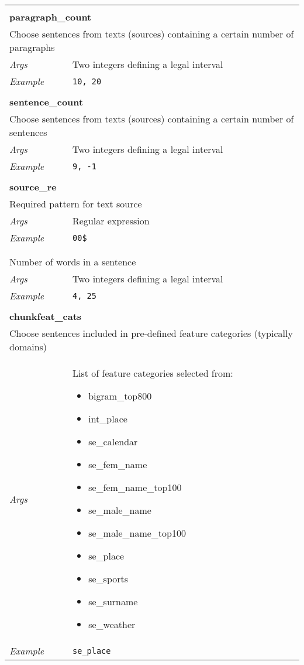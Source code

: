 \begin{longtable}{lp{12cm}}
  & \\
  
  \multicolumn{2}{l}{\bf paragraph\_count}\\
  \multicolumn{2}{l}{Choose sentences from texts (sources) containing a certain number of paragraphs}\\
  \em Args & Two integers defining a legal interval\\
  \em Example & \tt 10, 20\\

  & \\
  
  \multicolumn{2}{l}{\bf sentence\_count}\\
  \multicolumn{2}{l}{Choose sentences from texts (sources) containing a certain number of sentences}\\
  \em Args & Two integers defining a legal interval\\
  \em Example & \tt 9, -1\\

  & \\
  
  \multicolumn{2}{l}{\bf source\_re}\\
  \multicolumn{2}{l}{Required pattern for text source}\\
  \em Args & Regular expression\\
  \em Example & \tt 00\$\\

  & \\\newpage
  
  \multicolumn{2}{l}{\bf word\_count}\\
  \multicolumn{2}{l}{Number of words in a sentence}\\
  \em Args & Two integers defining a legal interval\\
  \em Example & \tt 4, 25\\

  & \\

  \multicolumn{2}{l}{\bf chunkfeat\_cats}\\
  \multicolumn{2}{l}{Choose sentences included in pre-defined feature categories (typically domains)}\\
  \em Args & List of feature categories selected from:
  \begin{itemize}[nosep]
  \item bigram\_top800
  \item int\_place
  \item se\_calendar
  \item se\_fem\_name
  \item se\_fem\_name\_top100
  \item se\_male\_name
  \item se\_male\_name\_top100
  \item se\_place
  \item se\_sports
  \item se\_surname
  \item se\_weather
  \end{itemize}\\[-12pt]
  \em Example & \tt se\_place

\end{longtable}

